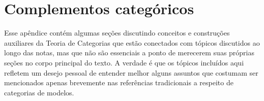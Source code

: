 \chapter{Complementos categóricos}

Esse apêndice contém algumas seções discutindo conceitos e construções auxiliares da Teoria de Categorias que estão conectados com tópicos discutidos ao longo das notas, mas que não são essenciais a ponto de merecerem suas próprias seções no corpo principal do texto.
A verdade é que os tópicos incluídos aqui refletem um desejo pessoal de entender melhor alguns assuntos que costumam ser mencionados apenas brevemente nas referências tradicionais a respeito de categorias de modelos.


